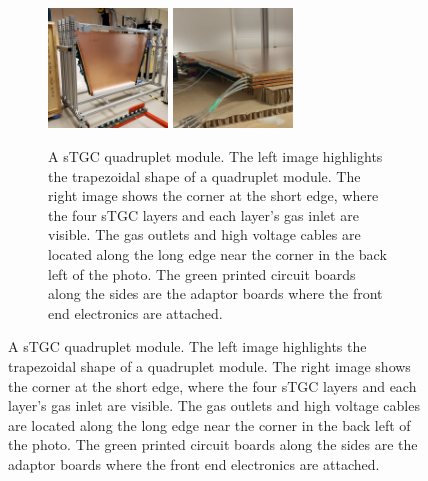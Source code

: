 \newpage
\thispagestyle{empty}
\begin{figure}
\centering
\begin{subfigure}{\textwidth}
  \centering
  \includegraphics[width=0.35\textwidth]{figures/stgc_quad_cart.jpg}
  \includegraphics[width=0.35\textwidth]{figures/stgc_quad_inlet_corner.jpg}
  \caption{A sTGC quadruplet module. The left image highlights the trapezoidal shape of a quadruplet module. The right image shows the corner at the short edge, where the four sTGC layers and each layer's gas inlet are visible. The gas outlets and high voltage cables are located along the long edge near the corner in the back left of the photo. The green printed circuit boards along the sides are the adaptor boards where the front end electronics are attached.}
  \label{fig:stgc_quad}
\end{subfigure}

\smallskip


\end{figure}
